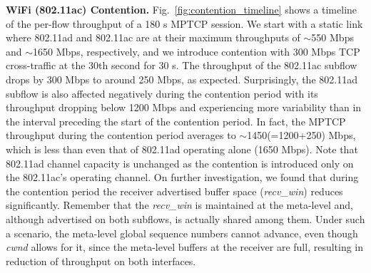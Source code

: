 \noindent\textbf{WiFi (802.11ac) Contention. } Fig.~\ref{fig:contention_timeline} shows a timeline of the
per-flow throughput of a 180 s MPTCP session. We start with a static link where 802.11ad and 802.11ac are 
at their maximum throughputs of $\sim$550 Mbps and $\sim$1650 Mbps, respectively, and we introduce
contention with 300 Mbps TCP cross-traffic at the 30th second for 30 s. The throughput of the 
802.11ac subflow drops by 300 Mbps to around 250 Mbps, as expected. Surprisingly, the 802.11ad subflow is also
affected negatively during the contention period with its throughput dropping below 1200 Mbps and experiencing more variability
than in the interval preceding the start of the contention period. In fact, the MPTCP throughput during the 
contention period averages to $\sim$1450(=1200+250) Mbps, which is less than even that of 802.11ad
operating alone (1650 Mbps). Note that 802.11ad channel capacity is unchanged as the contention is introduced 
only on the 802.11ac's operating channel. On further investigation, we found that during the
contention period the receiver advertised buffer space (\emph{recv\_win}) reduces significantly. 
Remember that the \emph{recv\_win} is maintained at the meta-level and, although
advertised on both subflows, is actually shared among them. Under such a scenario, the meta-level global sequence numbers
cannot advance, even though \emph{cwnd} allows for it, since the
meta-level buffers at the receiver are full, resulting in reduction of
throughput on both interfaces.


